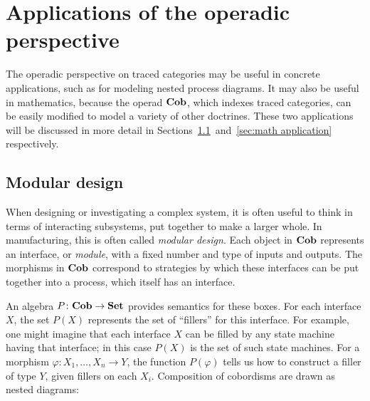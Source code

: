 \documentclass[12pt,oneside,article,draft]{memoir}
\begin{document}
\section{Applications of the operadic perspective}

The operadic perspective on traced categories may be useful in concrete applications, such as for
modeling nested process diagrams.  It may also be useful in mathematics, because the operad $\mathbf{Cob}$,
which indexes traced categories, can be easily modified to model a variety of other doctrines.
These two applications will be discussed in more detail in
Sections~\ref{sec:modular}~and~\ref{sec:math application} respectively.

\subsection{Modular design}\label{sec:modular}

When designing or investigating a complex system, it is often useful to think in terms of
interacting subsystems, put together to make a larger whole.  In manufacturing, this is often called
\emph{modular design}.  Each object in $\mathbf{Cob}$ represents an interface, or \emph{module}, with a
fixed number and type of inputs and outputs.  The morphisms in $\mathbf{Cob}$ correspond to strategies by
which these interfaces can be put together into a process, which itself has an interface.

An algebra $P\colon\mathbf{Cob}\to\mathbf{Set}$ provides semantics for these boxes.  For each interface $X$, the set
$P(X)$ represents the set of ``fillers'' for this interface.  For example, one might imagine that
each interface $X$ can be filled by any state machine having that interface; in this case $P(X)$ is
the set of such state machines.  For a morphism $\varphi\colon X_1,\ldots,X_n\to Y$, the function
$P(\varphi)$ tells us how to construct a filler of type $Y$, given fillers on each $X_i$.
Composition of cobordisms are drawn as nested diagrams:
\end{document}
